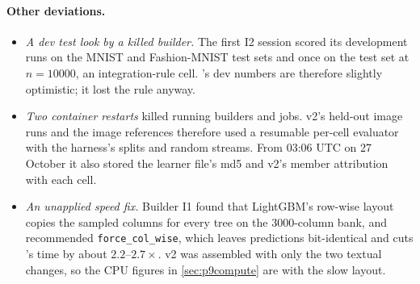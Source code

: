 \paragraph{Other deviations.}
\begin{itemize}
\item \emph{A dev test look by a killed builder.} The first I2 session scored its development runs on the MNIST and Fashion-MNIST test sets and once on the  test set at $n=10000$, an integration-rule cell. 's dev numbers are therefore slightly optimistic; it lost the rule anyway.
\item \emph{Two container restarts} killed running builders and jobs. v2's held-out image runs and the  image references therefore used a resumable per-cell evaluator with the harness's splits and random streams. From 03:06 UTC on 27 October it also stored the learner file's md5 and v2's member attribution with each cell.
\item \emph{An unapplied speed fix.} Builder I1 found that LightGBM's row-wise layout copies the sampled columns for every tree on the 3000-column bank, and recommended \texttt{force\_col\_wise}, which leaves predictions bit-identical and cuts 's time by about $2.2$--$2.7\times$. v2 was assembled with only the two textual changes, so the CPU figures in \cref{sec:p9compute} are with the slow layout.
\end{itemize}

